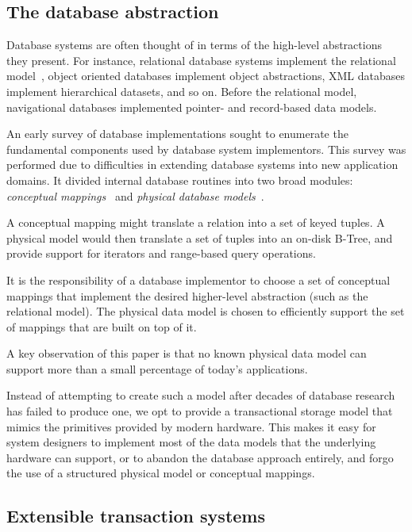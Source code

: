 \documentclass[letterpaper,twocolumn,10pt]{article}
\begin{document}
\subsection{The database abstraction}

Database systems are often thought of in terms of the high-level
abstractions they present.  For instance, relational database systems
implement the relational model~\cite{codd}, object oriented
databases implement object abstractions, XML databases implement
hierarchical datasets, and so on.  Before the relational model,
navigational databases implemented pointer- and record-based data models.

An early survey of database implementations sought to enumerate the
fundamental components used by database system implementors.  This
survey was performed due to difficulties in extending database systems
into new application domains.  It divided internal database
routines into two broad modules: {\em conceptual
mappings}~\cite{batoryConceptual} and {\em physical
database models}~\cite{batoryPhysical}.

A conceptual mapping might translate a relation into a set of keyed
tuples.  A physical model would then translate a set of tuples into an
on-disk B-Tree, and provide support for iterators and range-based query
operations.

It is the responsibility of a database implementor to choose a set of
conceptual mappings that implement the desired higher-level
abstraction (such as the relational model).  The physical data model
is chosen to efficiently support the set of mappings that are built on
top of it.

A key observation of this paper is that no known physical data model
can support more than a small percentage of today's applications.

Instead of attempting to create such a model after decades of database
research has failed to produce one, we opt to provide a transactional
storage model that mimics the primitives provided by modern hardware.
This makes it easy for system designers to implement most of the data
models that the underlying hardware can support, or to
abandon the database approach entirely, and forgo the use of a
structured physical model or conceptual mappings.

\subsection{Extensible transaction systems} 
\end{document}
